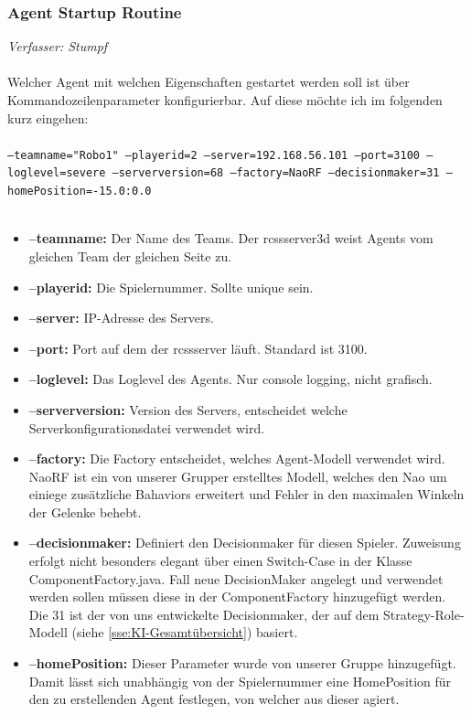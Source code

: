 \documentclass[fontsize=12pt,a4paper,final]{scrartcl}[2003/01/01]
\begin{document}
\subsubsection{Agent Startup Routine}
\textit{Verfasser: Stumpf}\\
\\
Welcher Agent mit welchen Eigenschaften gestartet werden soll ist über Kommandozeilenparameter konfigurierbar. Auf diese möchte ich im folgenden kurz eingehen:\\
\\
\texttt{--teamname="Robo1" --playerid=2 --server=192.168.56.101 --port=3100 --loglevel=severe --serverversion=68 --factory=NaoRF --decisionmaker=31 --homePosition=-15.0:0.0}\\
\\
\begin{itemize}
\item \textbf{--teamname:} Der Name des Teams. Der rcssserver3d weist Agents vom gleichen Team der gleichen Seite zu.
\item \textbf{--playerid:} Die Spielernummer. Sollte unique sein.
\item \textbf{--server:} IP-Adresse des Servers.
\item \textbf{--port:} Port auf dem der rcssserver läuft. Standard ist 3100.
\item \textbf{--loglevel:} Das Loglevel des Agents. Nur console logging, nicht grafisch.
\item \textbf{--serverversion:} Version des Servers, entscheidet welche Serverkonfigurationsdatei verwendet wird.
\item \textbf{--factory:} Die Factory entscheidet, welches Agent-Modell verwendet wird. NaoRF ist ein von unserer Grupper erstelltes Modell, welches den Nao um einiege zusätzliche Bahaviors erweitert und Fehler in den maximalen Winkeln der Gelenke behebt.
\item \textbf{--decisionmaker:} Definiert den Decisionmaker für diesen Spieler. Zuweisung erfolgt nicht besonders elegant über einen Switch-Case in der Klasse ComponentFactory.java. Fall neue DecisionMaker angelegt und verwendet werden sollen müssen diese in der ComponentFactory hinzugefügt werden. Die 31 ist der von uns entwickelte Decisionmaker, der auf dem Strategy-Role-Modell (siehe \autoref{sse:KI-Gesamtübersicht}) basiert.
\item \textbf{--homePosition:} Dieser Parameter wurde von unserer Gruppe hinzugefügt. Damit lässt sich unabhängig von der Spielernummer eine HomePosition für den zu erstellenden Agent festlegen, von welcher aus dieser agiert.
\end{itemize}
\end{document}
